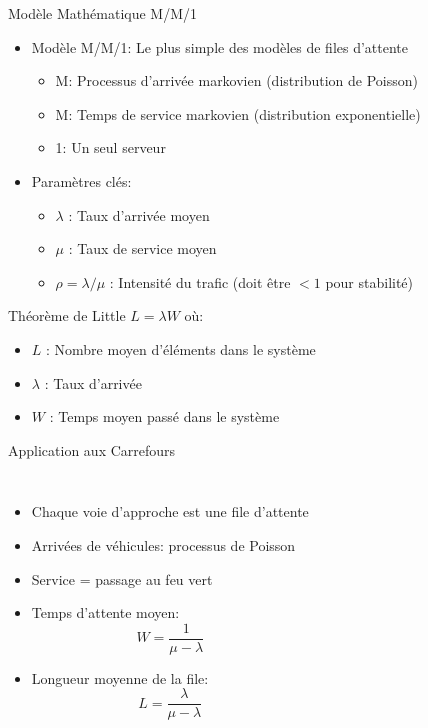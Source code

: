 \documentclass[11pt,a4paper]{article}
\begin{document}
\begin{frame}{Modèle Mathématique M/M/1}
    \begin{itemize}
    \item Modèle M/M/1: Le plus simple des modèles de files d'attente
        \begin{itemize}
        \item M: Processus d'arrivée markovien (distribution de Poisson)
        \item M: Temps de service markovien (distribution exponentielle)
        \item 1: Un seul serveur
        \end{itemize}
    \item Paramètres clés:
        \begin{itemize}
        \item $\lambda$ : Taux d'arrivée moyen
        \item $\mu$ : Taux de service moyen
        \item $\rho = \lambda/\mu$ : Intensité du trafic (doit être $< 1$ pour stabilité)
        \end{itemize}
    \end{itemize}
    
    \begin{block}{Théorème de Little}
    $L = \lambda W$ où:
    \begin{itemize}
    \item $L$ : Nombre moyen d'éléments dans le système
    \item $\lambda$ : Taux d'arrivée
    \item $W$ : Temps moyen passé dans le système
    \end{itemize}
    \end{block}
    \end{frame}
    
    \begin{frame}{Application aux Carrefours}
    \begin{columns}
    \begin{itemize}
    \item Chaque voie d'approche est une file d'attente
    \item Arrivées de véhicules: processus de Poisson
    \item Service = passage au feu vert
    \item Temps d'attente moyen:
        \begin{equation*}
        W = \frac{1}{\mu - \lambda}
        \end{equation*}
    \item Longueur moyenne de la file:
        \begin{equation*}
        L = \frac{\lambda}{\mu - \lambda}
        \end{equation*}
    \end{itemize}
    \end{columns}
    \end{frame}
\end{document}
